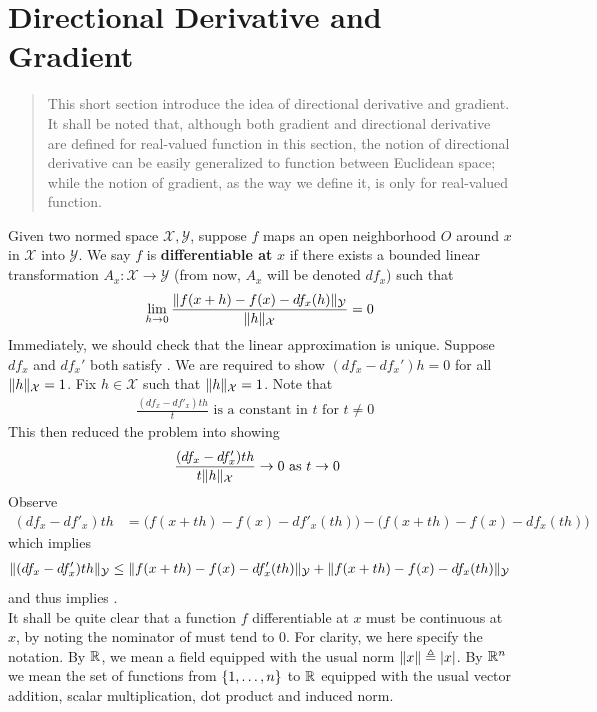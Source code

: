 \documentclass{report}
\begin{document}
\section{Directional Derivative and Gradient}
\label{Directional Derivative and Gradient}
\begin{abstract}
This short section introduce the idea of directional derivative and gradient. It shall be noted that, although both gradient and directional derivative are defined for real-valued function in this section, the notion of directional derivative can be easily generalized to function between Euclidean space; while the notion of gradient, as the way we define it, is only for real-valued function. 
\end{abstract}
\begin{mdframed}
Given two normed space $\mathcal{X},\mathcal{Y}$, suppose $f$ maps an open neighborhood $O$ around $x$ in $\mathcal{X}$ into $\mathcal{Y}$. We say $f$ is \textbf{differentiable at} $x$ if there exists a bounded linear transformation $A_x:\mathcal{X}\rightarrow \mathcal{Y}$ (from now, $A_x$ will be denoted $df_x$) such that  
\begin{align}
\label{defdi}
  \lim_{h\to 0} \frac{\| f(x+h)-f(x)-df_x(h) \|_\mathcal{Y}}{\| h \|_\mathcal{X}}=0 
\end{align}
Immediately, we should check that the linear approximation is unique. Suppose $df_x$ and  $df_x'$ both satisfy . We are required to show $(df_x-df_x')h=0$ for all $\| h \|_\mathcal{X}=1$. Fix $h\in \mathcal{X}$ such that $\| h \|_\mathcal{X}=1$. Note that 
\begin{align*}
 \frac{(df_x-df'_x)th}{t}\text{ is a constant in $t$ for $t\neq 0$ }
\end{align*}
This then reduced the problem into showing 
\begin{align}
\label{goaldib}
\frac{(df_x-df'_x)th}{t\| h \|_{\mathcal{X}}}\to 0\text{ as $t\to 0$ }
\end{align}
Observe 
\begin{align*}
  (df_x-df'_x)th&= \Big( f(x+th)-f(x)-df'_x(th)\Big) - \Big(f(x+th)-f(x)-df_x(th) \Big)
\end{align*}
which implies 
\begin{align*}
\| (df_x-df_x')th \|_\mathcal{Y}\leq \| f(x+th)-f(x)-df'_x(th) \|_{\mathcal{Y}}+ \| f(x+th)-f(x)-df_x(th) \|_\mathcal{Y}
\end{align*}
and thus implies .\\

It shall be quite clear that a function $f$ differentiable at $x$ must be continuous at $x$, by noting the nominator of  must tend to $0$. For clarity, we here specify the notation. By $\mathbb{R}$, we mean a field equipped with the usual norm $\| x \|\triangleq \left|x\right|$. By  $\mathbb{R}^n$ we mean the set of functions from $\{ 1,\dots ,n \}$ to $\mathbb{R}$ equipped with the usual vector addition, scalar multiplication, dot product and induced norm. 
\end{mdframed}
\end{document}
